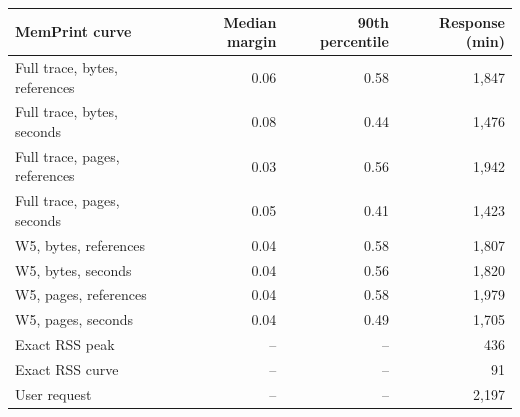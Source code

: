 \begin{tabular}{lrrr}
\toprule
MemPrint curve & Median margin & 90th percentile & Response (min) \\
\midrule
Full trace, bytes, references & 0.06 & 0.58 & 1{,}847 \\
Full trace, bytes, seconds & 0.08 & 0.44 & 1{,}476 \\
Full trace, pages, references & 0.03 & 0.56 & 1{,}942 \\
Full trace, pages, seconds & 0.05 & 0.41 & 1{,}423 \\
W5, bytes, references & 0.04 & 0.58 & 1{,}807 \\
W5, bytes, seconds & 0.04 & 0.56 & 1{,}820 \\
W5, pages, references & 0.04 & 0.58 & 1{,}979 \\
W5, pages, seconds & 0.04 & 0.49 & 1{,}705 \\
\midrule
Exact RSS peak & -- & -- & 436 \\
Exact RSS curve & -- & -- & 91 \\
User request & -- & -- & 2{,}197 \\
\bottomrule
\end{tabular}
